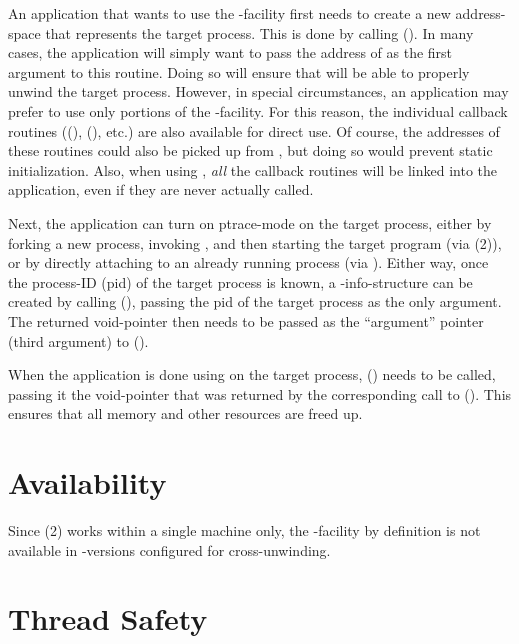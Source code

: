 \documentclass{article}
\begin{document}
An application that wants to use the -facility first needs
to create a new  address-space that represents the
target process.  This is done by calling
().  In many cases, the application
will simply want to pass the address of  as the
first argument to this routine.  Doing so will ensure that
 will be able to properly unwind the target process.
However, in special circumstances, an application may prefer to use
only portions of the -facility.  For this reason, the
individual callback routines ((),
(), etc.)  are also available for direct
use.  Of course, the addresses of these routines could also be picked
up from , but doing so would prevent static
initialization.  Also, when using , \emph{all}
the callback routines will be linked into the application, even if
they are never actually called.

Next, the application can turn on ptrace-mode on the target process,
either by forking a new process, invoking , and
then starting the target program (via (2)), or by
directly attaching to an already running process (via
).  Either way, once the process-ID (pid) of the
target process is known, a -info-structure can be created
by calling (), passing the pid of the target process
as the only argument.  The returned void-pointer then needs to be
passed as the ``argument'' pointer (third argument) to
().

When the application is done using  on the target
process, () needs to be called, passing it the
void-pointer that was returned by the corresponding call to
().  This ensures that all memory and other
resources are freed up.

\section{Availability}

Since (2) works within a single machine only, the
-facility by definition is not available in
-versions configured for cross-unwinding.

\section{Thread Safety}
\end{document}
